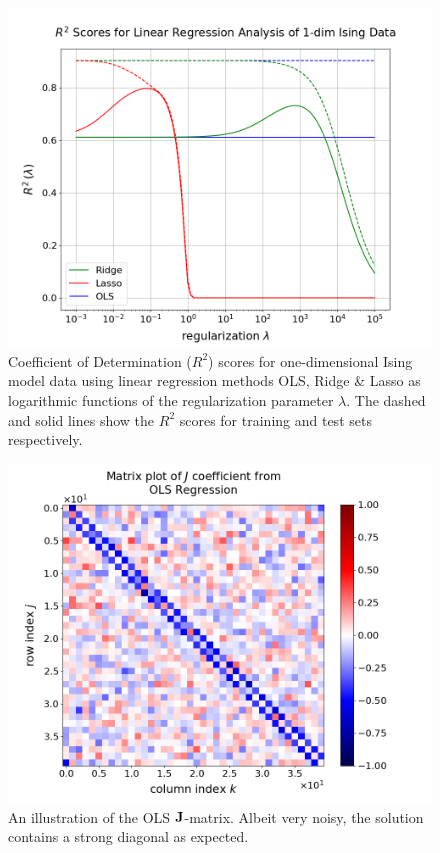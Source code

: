 \documentclass[nofootinbib,reprint,english]{revtex4-1}
\begin{document}
\begin{figure}[ht]
\centering
\includegraphics[scale=0.3]{../output/LinReg/gridsearch_R2.png}
\caption{Coefficient of Determination (\(R^2\)) scores for one-dimensional Ising model data using linear regression methods OLS, Ridge \& Lasso as logarithmic functions of the regularization parameter \(\lambda\). The dashed and solid lines show the \(R^2\) scores for training and test sets respectively.}\label{fig:LinReg_R2}
\end{figure}

\begin{figure}[ht]
\centering
\includegraphics[scale=0.3]{../output/LinReg/Jmatrix_OLS1.png}
\caption{An illustration of the OLS \(\vb{J}\)-matrix. Albeit very noisy, the solution contains a strong diagonal as expected.}\label{fig:LinReg_Jmatrix_OLS}
\end{figure}
\end{document}
